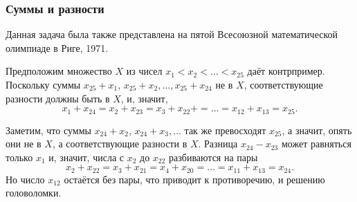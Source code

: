 \subsubsection*{Суммы и разности}%

Данная задача была также представлена на пятой Всесоюзной математической олимпиаде в Риге, 1971.

\medskip



Предположим множество $X$ из чисел $x_1 < x_2 < \dots < x_{25}$ даёт контрпример.
Поскольку суммы $x_{25} + x_1$, $x_{25} + x_2,\dots, x_{25} + x_{24}$ не в $X$,
соответствующие разности должны быть в $X$,
и, значит,
\[x_1 + x_{24} = x_2 + x_{23} = x_3 + x_{22} + =\dots = x_{12} + x_{13} = x_{25}.\]

Заметим, что суммы $x_{24} + x_2$, $x_{24} + x_3,\dots$ так же превосходят $x_{25}$,
а значит, опять они не в $X$, а соответствующие разности в $X$.
Разница $x_{24} - x_{23}$ может равняться только $x_1$ и, значит, числа с $x_2$ до $x_{22}$ разбиваются на пары 
\[x_2 + x_{22} = x_3 + x_{21} = x_4 + x_{20} =\dots= x_{11} + x_{13} = x_{24}.\]
Но число $x_{12}$ остаётся без пары, что приводит к противоречию, и решению головоломки.\heart

